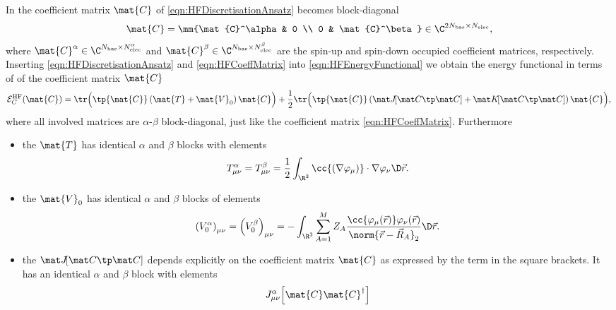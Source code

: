 \begin{rem}
	In \UHF the coefficient matrix $\mat{C}$ of \eqref{eqn:HFDiscretisationAnsatz}
	becomes block-diagonal
	\begin{equation}
		\label{eqn:HFCoeffMatrix}
		\mat{C} = \mm{\mat{C}^\alpha & 0 \\
				0 & \mat{C}^\beta}
			\in \C^{2\Nbas \times \Nelec},
	\end{equation}
	where $\mat{C}^\alpha \in \C^{\Nbas \times \NelecA}$
	and $\mat{C}^\beta \in \C^{\Nbas \times \NelecB}$
	are the spin-up and spin-down occupied coefficient matrices, respectively.
	Inserting \eqref{eqn:HFDiscretisationAnsatz} and \eqref{eqn:HFCoeffMatrix}
	into \eqref{eqn:HFEnergyFunctional}
	we obtain the \HF energy functional in terms of
	of the coefficient matrix $\mat{C}$
	\begin{equation}
		\Ehf_C(\mat{C})
			= \tr \Big( \tp{\mat{C}} \left(\mat{T} + \mat{V}_0 \right) \mat{C} \Big)
			+ \frac12 \tr \Big( \tp{\mat{C}} \left(\matJfull + \matKfull \right) \mat{C} \Big),
		\label{eqn:HFEnergyFunctionalCoeff}
	\end{equation}
	where all involved matrices are $\alpha$-$\beta$ block-diagonal,
	just like the coefficient matrix \eqref{eqn:HFCoeffMatrix}.
	Furthermore
	\begin{itemize}
		\item the 
			$\mat{T}$ has identical $\alpha$ and $\beta$ blocks
			with elements
			\begin{equation}
				T^\alpha_{\mu\nu} = T^\beta_{\mu\nu}
				= \frac12 \int_{\R^3} \cc{\left(\nabla \varphi_\mu\right)}
					\cdot \nabla \varphi_\nu \D\vec{r}.
				\label{eqn:Tbas}
			\end{equation}
		\item the  $\mat{V}_0$
			has identical $\alpha$ and $\beta$ blocks of elements
			\begin{equation}
				\left(V^\alpha_0\right)_{\mu\nu} = \left(V^\beta_0\right)_{\mu\nu}
				= - \int_{\R^3} \sum_{A=1}^M Z_A
				\frac{\cc{\varphi_\mu(\vec{r})} \varphi_\nu(\vec{r})}{\norm{\vec{r} - \vec{R}_A}_2}
				\D \vec{r}.
				\label{eqn:Vbas}
			\end{equation}
		\item the  $\matJfull$
			depends explicitly on the coefficient matrix $\mat{C}$
			as expressed by the term in the square brackets.
			It has an identical $\alpha$ and $\beta$ block with elements
			\begin{equation}
				J_{\mu\nu}^\alpha\!\left[\mat{C}\mat{C}^\dagger\right]

\end{equation}
\end{itemize}
\end{rem}
